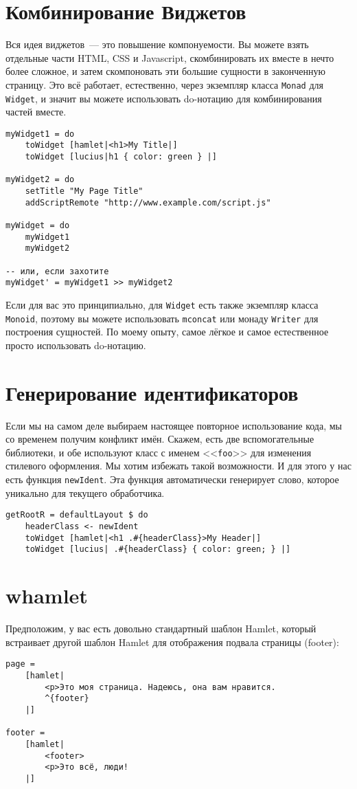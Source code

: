 \section{Комбинирование Виджетов}
Вся идея виджетов~--- это повышение компонуемости. Вы можете взять отдельные
части HTML, CSS и Javascript, скомбинировать их вместе в нечто более сложное, и
затем скомпоновать эти большие сущности в законченную страницу. Это всё
работает, естественно, через экземпляр класса \lstinline'Monad' для
\lstinline'Widget', и значит вы можете использовать do-нотацию для
комбинирования частей вместе.
\begin{lstlisting}
myWidget1 = do
    toWidget [hamlet|<h1>My Title|]
    toWidget [lucius|h1 { color: green } |]

myWidget2 = do
    setTitle "My Page Title"
    addScriptRemote "http://www.example.com/script.js"

myWidget = do
    myWidget1
    myWidget2

-- или, если захотите
myWidget' = myWidget1 >> myWidget2
\end{lstlisting}

\begin{remark}
    Если для вас это принципиально, для \lstinline'Widget' есть также экземпляр
    класса \lstinline'Monoid', поэтому вы можете использовать
    \lstinline'mconcat' или монаду \lstinline'Writer' для построения сущностей.
    По моему опыту, самое лёгкое и самое естественное просто использовать
    do-нотацию.
\end{remark}

\section{Генерирование идентификаторов}
Если мы на самом деле выбираем настоящее повторное использование кода, мы со
временем получим конфликт имён. Скажем, есть две вспомогательные библиотеки, и
обе используют класс с именем <<\lstinline'foo'>> для изменения стилевого
оформления. Мы хотим избежать такой возможности. И для этого у нас есть функция
\lstinline'newIdent'. Эта функция автоматически генерирует слово, которое
уникально для текущего обработчика.
\begin{lstlisting}
getRootR = defaultLayout $ do
    headerClass <- newIdent
    toWidget [hamlet|<h1 .#{headerClass}>My Header|]
    toWidget [lucius| .#{headerClass} { color: green; } |]
\end{lstlisting}

\section{whamlet}
Предположим, у вас есть довольно стандартный шаблон Hamlet, который встраивает
другой шаблон Hamlet для отображения подвала страницы (footer):
\begin{lstlisting}
page =
    [hamlet|
        <p>Это моя страница. Надеюсь, она вам нравится.
        ^{footer}
    |]

footer =
    [hamlet|
        <footer>
        <p>Это всё, люди!
    |]
\end{lstlisting}

